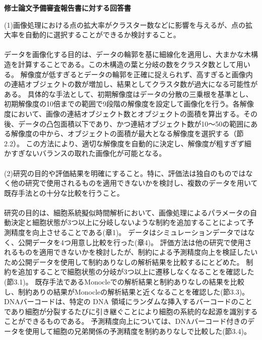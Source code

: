 \documentclass[12pt]{article}
\begin{document}
\begin{center}
\textbf{修士論文予備審査報告書に対する回答書}  %
\end{center}
(1)画像処理における点の拡大率がクラスター数などに影響を与えるが、点の拡大率を自動的に選択することができるか検討すること。\\\\
データを画像化する目的は、データの輪郭を基に細線化を適用し、大まかな木構造を計算することである。この木構造の葉と分岐の数をクラスタ数として用いる。
解像度が低すぎるとデータの輪郭を正確に捉えられず、高すぎると画像内の連結オブジェクトの数が増加し、結果としてクラスタ数が過大になる可能性がある。
具体的な手法として、初期解像度はデータの分散の三乗根を基準とし、初期解像度の10倍までの範囲で9段階の解像度を設定して画像化を行う。各解像度において、画像の連結オブジェクト数とオブジェクトの面積を算出する。その後、データの凸包面積以下であり、かつ連結オブジェクト数が10〜50の範囲にある解像度の中から、オブジェクトの面積が最大となる解像度を選択する（節2.2）。
この方法により、適切な解像度を自動的に決定し、解像度が粗すぎず細かすぎないバランスの取れた画像化が可能となる。
\\
\\
(2)研究の目的や評価結果を明確にすること。特に、評価法は独自のものではなく他の研究で使用されるものを適用できないかを検討し、複数のデータを用いて既存手法との十分な比較を行うこと。\\\\
研究の目的は、細胞系統擬似時間解析において、画像処理によるパラメータの自動決定と細胞状態が3つ以上に分岐しないような制約を追加することによって予測精度を向上させることである(章1)。
データはシミュレーションデータではなく、公開データを4つ用意し比較を行った(章4)。
評価方法は他の研究で使用されるものを適用できないかを検討したが、制約による予測精度向上を検証したいため公開データを使用して制約ありなしの解析結果を比較するにとどめた。
制約を追加することで細胞状態の分岐が3つ以上に遷移しなくなることを確認した(節3.1)。
既存手法であるMonocleでの解析結果と制約ありなしの結果を比較し、制約ありの結果がMonocleの解析結果と近くなることを確認した(節3.3)。
DNAバーコードは、特定の DNA 領域にランダムな挿入するバーコードのことであり細胞が分裂するたびに引き継ぐことにより細胞の系統的な起源を識別することができるものである。
予測精度向上については、DNAバーコード付きのデータを使用して細胞の兄弟関係の予測精度を制約ありなしで比較した(節3.4)。
\end{document}
